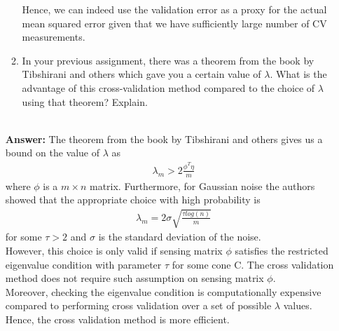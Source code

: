 \documentclass[12pt]{article}
\begin{document}
\begin{itemize}
\begin{enumerate}
Hence, we can indeed use the validation error as a proxy for the actual mean squared error given that we have sufficiently large number of CV measurements.

\item In your previous assignment, there was a theorem from the book by Tibshirani and others which gave you a certain value of $\lambda$. What is the advantage of this cross-validation method compared to the choice of $\lambda$ using that theorem? Explain.
\end{enumerate}\\
\textbf{Answer:} The theorem from the book by Tibshirani and others gives us a bound on the value of $\lambda$ as 
\begin{gather*}
    \lambda_m > 2\frac{\phi^T \eta}{m}
\end{gather*}
where $\phi$ is a $m \times n$ matrix. Furthermore, for Gaussian noise the authors showed that the appropriate choice with high probability is 
\begin{gather*}
    \lambda_m = 2\sigma\sqrt{\frac{\tau log(n)}{m}}
\end{gather*}
for some $\tau > 2$ and $\sigma$ is the standard deviation of the noise.\\
However, this choice is only valid if sensing matrix $\phi$ satisfies the restricted eigenvalue condition with parameter $\tau$ for some cone C. The cross validation method does not require such assumption on sensing matrix $\phi$. \\
Moreover, checking the eigenvalue condition is computationally expensive compared to performing cross validation over a set of possible $\lambda$ values. Hence, the cross validation method is more efficient.



\end{itemize}
\end{document}
